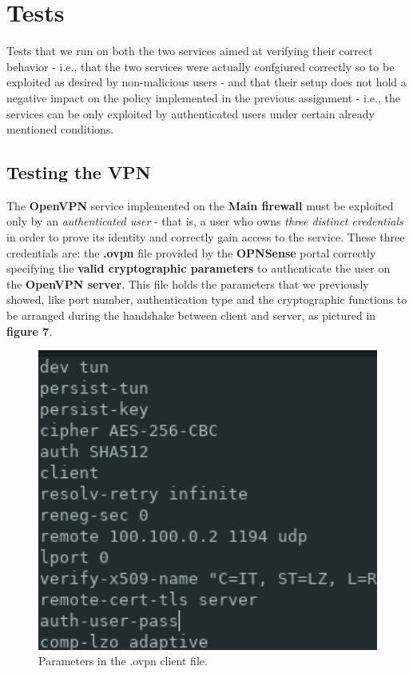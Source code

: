\section{Tests}
Tests that we run on both the two services aimed at verifying their correct behavior - i.e., that the two services were actually confgiured correctly so to be exploited as desired by non-malicious users - and that their setup does not hold a negative impact on the policy implemented in the previous assignment - i.e., the services can be only exploited by authenticated users under certain already mentioned conditions.

\subsection{Testing the VPN}
The \textbf{OpenVPN} service implemented on the \textbf{Main firewall} must be exploited only by an \textit{authenticated user} - that is, a user who owns \textit{three distinct credentials} in order to prove its identity and correctly gain access to the service. These three credentials are: the \textbf{.ovpn} file provided by the \textbf{OPNSense} portal correctly specifying the \textbf{valid cryptographic parameters} to authenticate the user on the \textbf{OpenVPN server}. This file holds the parameters that we previously showed, like port number, authentication type and the cryptographic functions to be arranged during the handshake between client and server, as pictured in \textbf{figure 7}.

\begin{figure}[!htb]
\centering
\begin{minipage}{.33\textwidth}
  \centering
  \includegraphics[width=1\textwidth]{ovpnParams.png}
  \caption[a]{Parameters in the .ovpn client file.}\label{fig:7}
\end{minipage}%
\end{figure}

